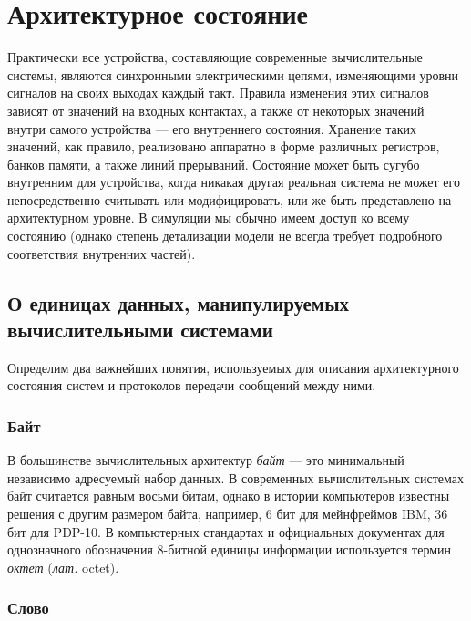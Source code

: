 \chapter{Архитектурное состояние}\label{state}


Практически все устройства, составляющие современные вычислительные системы, являются синхронными электрическими цепями, изменяющими уровни сигналов на своих выходах каждый такт. Правила изменения этих сигналов зависят от значений на входных контактах, а также от некоторых значений внутри самого устройства — его внутреннего состояния. Хранение таких значений, как правило, реализовано аппаратно в форме различных регистров, банков памяти, а также линий прерываний. Состояние может быть сугубо внутренним для устройства, когда никакая другая реальная система не может его непосредственно считывать или модифицировать, или же быть представлено на архитектурном уровне. В симуляции мы обычно имеем доступ ко всему состоянию (однако степень детализации модели не всегда требует подробного соответствия внутренних частей).

\section[О единицах данных]{О единицах данных, манипулируемых вычислительными системами}

Определим два важнейших понятия, используемых для описания архитектурного состояния систем и протоколов передачи сообщений между ними.

\subsection{Байт}
В большинстве вычислительных архитектур \textit{байт} — это минимальный независимо адресуемый набор данных. В современных вычислительных системах байт считается равным восьми битам, однако в истории компьютеров известны решения с другим размером байта, например, 6 бит для мейнфреймов IBM, 36 бит для PDP-10. В компьютерных стандартах и официальных документах для однозначного обозначения 8-битной единицы информации используется термин \textit{октет} (\textit{лат.} octet).

\subsection{Слово}

